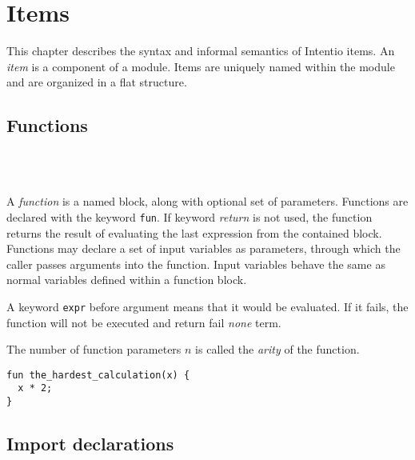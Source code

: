 \chapter{Items}

This chapter describes the syntax and informal semantics of Intentio items. An \emph{item} is a component of a module. Items are uniquely named within the module and are organized in a flat structure.

\begin{bnf}
   \eq    {}    
                \gorln {} 
\end{bnf}

\section{Functions}

\begin{bnf}
   \eq {} \  \ \term{(} \  \ \term{)} \  \\
   \eq {} \  \ \gtry{\term{,}}
\end{bnf}

A \emph{function} is a named block, along with optional set of parameters. Functions are declared with the keyword \lstinline{fun}. If keyword \emph{return} is not used, the function returns the result of evaluating the last expression from the contained block. Functions may declare a set of input variables as parameters, through which the caller passes arguments into the function. Input variables behave the same as normal variables defined within a function block.

A keyword \lstinline{expr} before argument means that it would be evaluated. If it fails, the function will not be executed and return fail \emph{none} term.

The number of function parameters $n$ is called the \emph{arity} of the function.

\begin{example}
\begin{lstlisting}
fun the_hardest_calculation(x) {
  x * 2;
}
\end{lstlisting}
\end{example}

\section{Import declarations}

